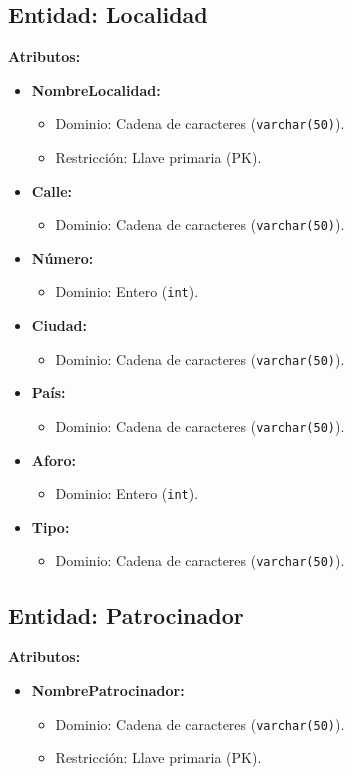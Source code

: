 \subsection*{Entidad: Localidad}
\textbf{Atributos:}
\begin{itemize}
    \item \textbf{NombreLocalidad:}
    \begin{itemize}
        \item Dominio: Cadena de caracteres (\texttt{varchar(50)}).
        \item Restricción: Llave primaria (PK).
    \end{itemize}
    \item \textbf{Calle:}
    \begin{itemize}
        \item Dominio: Cadena de caracteres (\texttt{varchar(50)}).
    \end{itemize}
    \item \textbf{Número:}
    \begin{itemize}
        \item Dominio: Entero (\texttt{int}).
    \end{itemize}
    \item \textbf{Ciudad:}
    \begin{itemize}
        \item Dominio: Cadena de caracteres (\texttt{varchar(50)}).
    \end{itemize}
    \item \textbf{País:}
    \begin{itemize}
        \item Dominio: Cadena de caracteres (\texttt{varchar(50)}).
    \end{itemize}
    \item \textbf{Aforo:}
    \begin{itemize}
        \item Dominio: Entero (\texttt{int}).
    \end{itemize}
    \item \textbf{Tipo:}
    \begin{itemize}
        \item Dominio: Cadena de caracteres (\texttt{varchar(50)}).
    \end{itemize}
\end{itemize}


\subsection*{Entidad: Patrocinador}
\textbf{Atributos:}
\begin{itemize}
    \item \textbf{NombrePatrocinador:}
    \begin{itemize}
        \item Dominio: Cadena de caracteres (\texttt{varchar(50)}).
        \item Restricción: Llave primaria (PK).
    \end{itemize}
\end{itemize}

